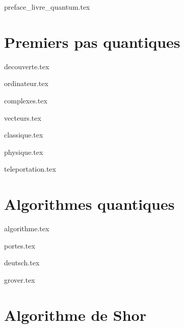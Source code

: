 \documentclass[10pt,twoside,openright]{report}
\begin{document}
\renewcommand{\contentsname}{Sommaire}

{preface_livre_quantum.tex}
\debutchapitres
{}


\clearemptydoublepage


\part{Premiers pas quantiques}

{decouverte.tex}

{ordinateur.tex}

{complexes.tex}

{vecteurs.tex}

{classique.tex}

{physique.tex}

{teleportation.tex}


\clearemptydoublepage
\part{Algorithmes quantiques}

{algorithme.tex}

{portes.tex}

{deutsch.tex}

{grover.tex}

\clearemptydoublepage
\part{Algorithme de Shor}
\end{document}
